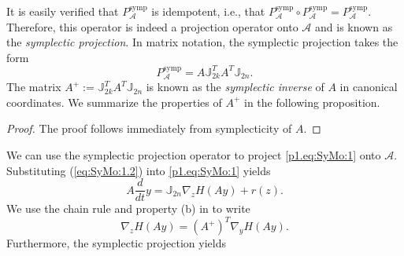 It is easily verified that $P^{\text{symp}}_{\mathcal A}$ is idempotent, i.e., that $P^{\text{symp}}_{\mathcal A}\circ P^{\text{symp}}_{\mathcal A} = P^{\text{symp}}_{\mathcal A}$. Therefore, this operator is indeed a projection operator onto $\mathcal A$ and is known as the \emph{symplectic projection}. In matrix notation, the symplectic projection takes the form
\begin{equation} \label{p1.eq:SyMo:1.5}
	P^{\text{symp}}_{\mathcal A} = A \mathbb J_{2k}^T A^T \mathbb J_{2n}.
\end{equation}
The matrix $A^+ := \mathbb J_{2k}^T A^T \mathbb J_{2n}$ is known as the \emph{symplectic inverse} of $A$ in canonical coordinates. We summarize the properties of $A^+$ in the following proposition.
\begin{proof}
The proof follows immediately from symplecticity of $A$.
\end{proof}
We can use the symplectic projection operator to project \eqref{p1.eq:SyMo:1} onto $\mathcal A$. Substituting (\ref{eq:SyMo:1.2}) into \eqref{p1.eq:SyMo:1} yields
\begin{equation} \label{p1.eq:SyMo:2}
	A \frac d {dt}y = \mathbb{J}_{2n} \nabla_{z} H(A y) + r(z). 
\end{equation}
We use the chain rule and property (b) in  to write 
\begin{equation}
	\nabla_{z} H(A y) = (A^+)^T \nabla_{y} H( Ay ).
\end{equation}
 Furthermore, the symplectic projection yields
